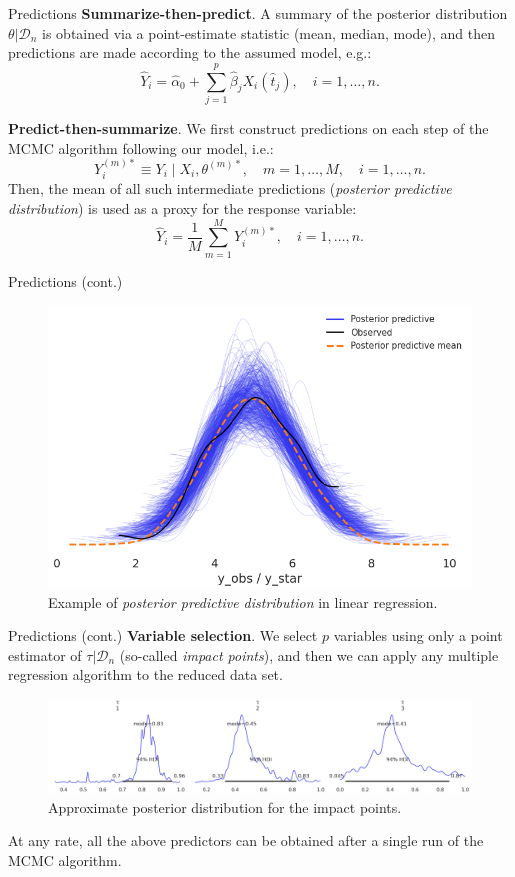 \documentclass[10pt, english, professionalfonts]{beamer}
\begin{document}
\begin{frame}{Predictions}
  \textbf{Summarize-then-predict}. A summary of the posterior distribution \(\theta| \mathcal D_n\) is obtained via a point-estimate statistic (mean, median, mode), and then predictions are made according to the assumed model, e.g.:
  \[
  \hat Y_i =\hat \alpha_0 + \sum_{j=1}^p \hat \beta_j X_i(\hat t_j), \quad i=1,\dots, n.
  \]

  \textbf{Predict-then-summarize}. We first construct predictions on each step of the MCMC algorithm following our model, i.e.:
  \[
    Y_i^{(m)*} \equiv Y_i \mid X_i, \theta^{(m)*}, \quad m=1,\dots,M, \quad i=1,\dots, n.
  \]
  Then, the mean of all such intermediate predictions (\textit{posterior predictive distribution}) is used as a proxy for the response variable:
  \[
    \hat Y_i = \frac{1}{M}\sum_{m=1}^M Y_i^{(m)*}, \quad i=1,\dots, n.
  \]

\end{frame}

\begin{frame}{Predictions (cont.)}
    \vspace{1em}
  \begin{figure}
    \includegraphics[width=.75\textwidth]{img/ppc_lin_standalone}
    \caption{Example of \textit{posterior predictive distribution} in linear regression.}
  \end{figure}
\end{frame}

\begin{frame}{Predictions (cont.)}
    \textbf{Variable selection}. We select \(p\) variables using only a point estimator of \(\tau|\mathcal D_n\) (so-called \textit{impact points}), and then we can apply any multiple regression algorithm to the reduced data set.
    \vspace{1em}

    \begin{figure}
      \includegraphics[width=\textwidth]{img/tau_posterior}
      \caption{Approximate posterior distribution for the impact points.}
    \end{figure}

    At any rate, all the above predictors can be obtained after a single run of the MCMC algorithm.
\end{frame}
\end{document}
